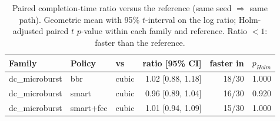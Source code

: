 \begin{table}[t]\centering\footnotesize
\caption{Paired completion-time ratio versus the reference (same seed $\Rightarrow$ same path). Geometric mean with 95\% $t$-interval on the log ratio; Holm-adjusted paired $t$ $p$-value within each family and reference. Ratio $<1$: faster than the reference.}
\label{tab:scalepaired}\begin{tabular}{lllrrr}\toprule
Family & Policy & vs & ratio [95\% CI] & faster in & $p_{Holm}$\\\midrule
dc\_microburst & bbr & cubic & 1.02 [0.88, 1.18] & 18/30 & 1.000 \\
dc\_microburst & smart & cubic & 0.96 [0.89, 1.04] & 16/30 & 0.920 \\
dc\_microburst & smart+fec & cubic & 1.01 [0.94, 1.09] & 15/30 & 1.000 \\
\bottomrule\end{tabular}\end{table}
